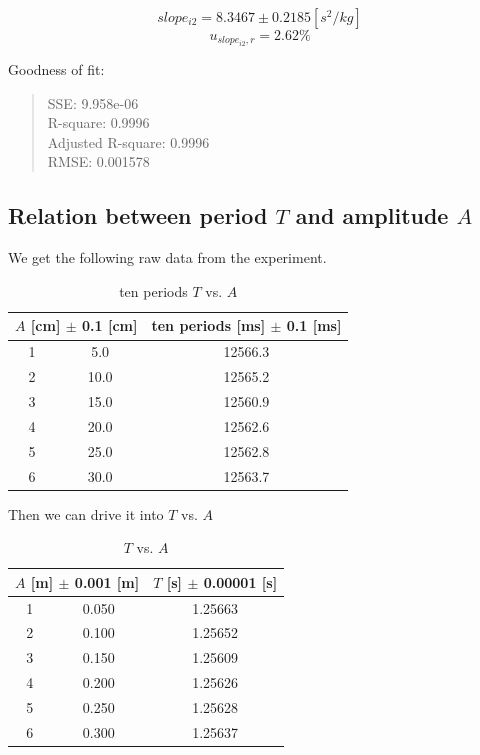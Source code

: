 $$slope_{i2} = 8.3467 \pm 0.2185 [s^2/kg] $$
$$ u_{slope_{i2},r} = 2.62 \% $$

Goodness of fit:
\begin{quote}
	\centering
  SSE: 9.958e-06 				\\
  R-square: 0.9996 				\\
  Adjusted R-square: 0.9996 	\\
  RMSE: 0.001578 				\\
\end{quote}


\subsection{Relation between period $T$ and amplitude $A$}

We get the following raw data from the experiment.
\begin{table}[H]
	\centering
	\begin{tabular}{|c|c|c|}
	\hline
	\multicolumn{2}{|c|}{ $A$ [cm] $\pm$ 0.1 [cm]} & ten periods [ms] $\pm$ 0.1 [ms] \\ \hline
	1 &  5.0 & 12566.3 \\ \hline
	2 & 10.0 & 12565.2 \\ \hline
	3 & 15.0 & 12560.9 \\ \hline
	4 & 20.0 & 12562.6 \\ \hline
	5 & 25.0 & 12562.8 \\ \hline
	6 & 30.0 & 12563.7 \\ \hline
	\end{tabular}
	\caption{ten periods $T$ vs. $A$}
\label{TvsAraw}
\end{table}

Then we can drive it into $T$ vs. $A$

\begin{table}[H]
	\centering
	\begin{tabular}{|c|c|c|}
	\hline
	\multicolumn{2}{|c|}{ $A$ [m] $\pm$ 0.001 [m]} & $T$ [s] $\pm$ 0.00001 [s] \\ \hline
	1 & 0.050 & 1.25663 \\ \hline
	2 & 0.100 & 1.25652 \\ \hline
	3 & 0.150 & 1.25609 \\ \hline
	4 & 0.200 & 1.25626 \\ \hline
	5 & 0.250 & 1.25628 \\ \hline
	6 & 0.300 & 1.25637 \\ \hline
	\end{tabular}
	\caption{$T$ vs. $A$}
\label{TvsA}
\end{table}


